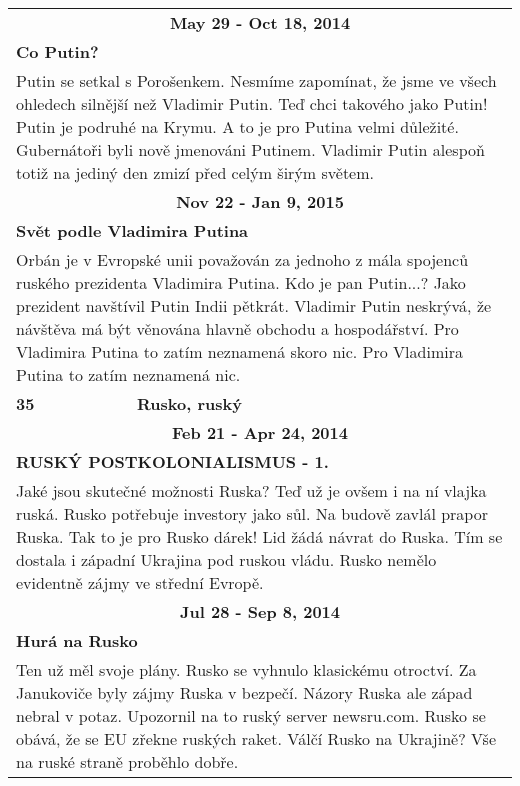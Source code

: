 \begin{tabularx}{\linewidth}{l l}
                \multicolumn{2}{c}{\bf May 29 - Oct 18, 2014} \\
                \multicolumn{2}{p{\linewidth}}{\bf Co Putin?} \\
                \multicolumn{2}{p{\linewidth}}{Putin se setkal s Porošenkem. Nesmíme zapomínat, že jsme ve všech ohledech silnější než Vladimir Putin. Teď chci takového jako Putin! Putin je podruhé na Krymu. A to je pro Putina velmi důležité. Gubernátoři byli nově jmenováni Putinem. Vladimir Putin alespoň totiž na jediný den zmizí před celým širým světem.} \\ \midrule
                
                \multicolumn{2}{c}{\bf Nov 22 - Jan 9, 2015} \\
                \multicolumn{2}{p{\linewidth}}{\bf Svět podle Vladimira Putina} \\
                \multicolumn{2}{p{\linewidth}}{Orbán je v Evropské unii považován za jednoho z mála spojenců ruského prezidenta Vladimira Putina. Kdo je pan Putin...? Jako prezident navštívil Putin Indii pětkrát. Vladimir Putin neskrývá, že návštěva má být věnována hlavně obchodu a hospodářství. Pro Vladimira Putina to zatím neznamená skoro nic. Pro Vladimira Putina to zatím neznamená nic.} \\ \midrule
                [1.5pt]

            \bf 35 & \bf Rusko, ruský \\ \midrule
            
                \multicolumn{2}{c}{\bf Feb 21 - Apr 24, 2014} \\
                \multicolumn{2}{p{\linewidth}}{\bf RUSKÝ POSTKOLONIALISMUS - 1.} \\
                \multicolumn{2}{p{\linewidth}}{Jaké jsou skutečné možnosti Ruska? Teď už je ovšem i na ní vlajka ruská. Rusko potřebuje investory jako sůl. Na budově zavlál prapor Ruska. Tak to je pro Rusko dárek! Lid žádá návrat do Ruska. Tím se dostala i západní Ukrajina pod ruskou vládu. Rusko nemělo evidentně zájmy ve střední Evropě.} \\ \midrule
                
                \multicolumn{2}{c}{\bf Jul 28 - Sep 8, 2014} \\
                \multicolumn{2}{p{\linewidth}}{\bf Hurá na Rusko} \\
                \multicolumn{2}{p{\linewidth}}{Ten už měl svoje plány. Rusko se vyhnulo klasickému otroctví. Za Janukoviče byly zájmy Ruska v bezpečí. Názory Ruska ale západ nebral v potaz. Upozornil na to ruský server newsru.com. Rusko se obává, že se EU zřekne ruských raket.  Válčí Rusko na Ukrajině? Vše na ruské straně proběhlo dobře.} \\ \midrule
                

\end{tabularx}
